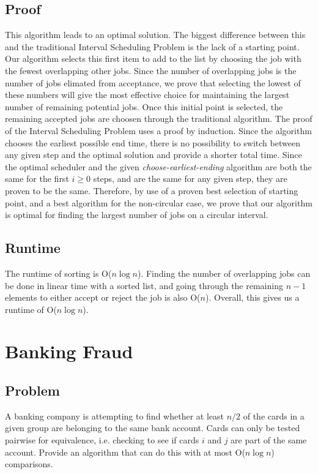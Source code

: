 \documentclass[titlepage]{article}
\numberwithin{equation}{subsection}
\begin{document}
\subsection{Proof}
This algorithm leads to an optimal solution. The biggest difference between this and the traditional
Interval Scheduling Problem is the lack of a starting point. Our algorithm selects this first item to
add to the list by choosing the job with the fewest overlapping other jobs. Since the number of overlapping
jobs is the number of jobs elimated from acceptance, we prove that selecting the lowest of these numbers will
give the most effective choice for maintaining the largest number of remaining potential jobs. Once this initial
point is selected, the remaining accepted jobs are choosen through the traditional algorithm. The proof of
the Interval Scheduling Problem uses a proof by induction. Since the algorithm chooses the earliest possible
end time, there is no possibility to switch between any given step and the optimal solution and provide a shorter
total time. Since the optimal scheduler and the given \textit{choose-earliest-ending} algorithm are both the same
for the first $i\geq0$ steps, and are the same for any given step, they are proven to be the same. Therefore, by
use of a proven best selection of starting point, and a best algorithm for the non-circular case, we prove that
our algorithm is optimal for finding the largest number of jobs on a circular interval.
\subsection{Runtime} %
The runtime of sorting is O($n\log n$). Finding the number of overlapping jobs can be done in linear
time with a sorted list, and going through the remaining $n-1$ elements to either accept or reject the job
is also O($n$). Overall, this gives us a runtime of O($n\log n$).
\section{Banking Fraud}
\subsection{Problem}
A banking company is attempting to find whether at least $n/2$ of the cards in a given group are belonging
to the same bank account. Cards can only be tested pairwise for equivalence, i.e. checking to see 
if cards $i$ and $j$ are part of the same account. Provide an algorithm that can do this with at most
O($n\log n$) comparisons.
\end{document}
